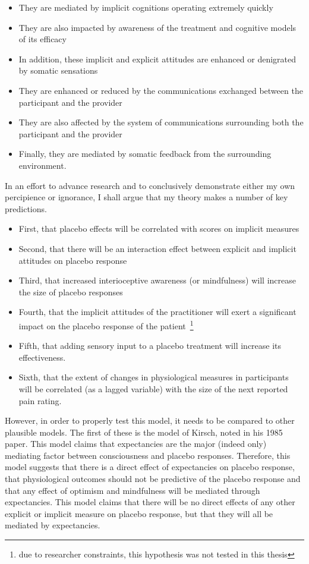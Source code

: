 \begin{itemize}
\item They are mediated by implicit cognitions operating extremely quickly
\item They are also impacted by awareness of the treatment and cognitive models of its efficacy
\item In addition, these implicit and explicit attitudes are enhanced or denigrated by somatic sensations
\item They are enhanced or reduced by the communications exchanged between the participant and the provider
\item They are also affected by the system of communications surrounding both the participant and the provider
\item Finally, they are mediated by somatic feedback from the surrounding environment.
\end{itemize}
 
In an effort to advance research and to conclusively demonstrate either my own percipience or ignorance, I shall argue that my theory makes a number of key predictions. 

\begin{itemize}
\item First, that placebo effects will be correlated with scores on implicit measures
\item Second, that there will be an interaction effect between explicit and implicit attitudes on placebo response
\item Third, that increased interioceptive awareness (or mindfulness) will increase the size of placebo responses
\item Fourth, that the implicit attitudes of the practitioner will exert a significant impact on the placebo response of the patient~\footnote{due to researcher constraints, this hypothesis was not tested in this thesis}
\item Fifth, that adding sensory input to a placebo treatment will increase its effectiveness. 
\item Sixth, that the extent of changes in physiological measures in participants will be correlated (as a lagged variable) with the size of the next reported pain rating.
\end{itemize}

However, in order to properly test this model, it needs to be compared to other plausible models. The first of these is the model of Kirsch, noted in his 1985 paper. This model claims that expectancies are the major (indeed only) mediating factor between consciousness and placebo responses. Therefore, this model suggests that there is a direct effect of expectancies on placebo response, that physiological outcomes should not be predictive of the placebo response and that any effect of optimism and mindfulness will be mediated through expectancies. This model claims that there will be no direct effects of any other explicit or implicit measure on placebo response, but that they will all be mediated by expectancies. 

